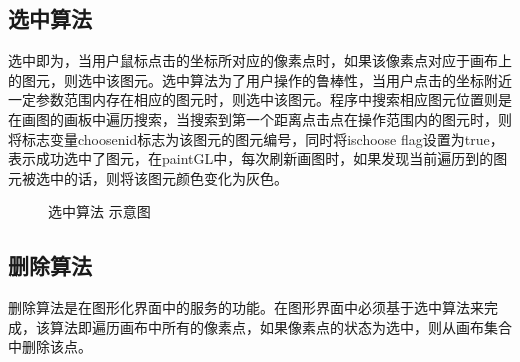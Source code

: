 \documentclass[a4paper,UTF8]{article}
\theoremstyle{definition}
\begin{document}
\subsection{选中算法}
选中即为，当用户鼠标点击的坐标所对应的像素点时，如果该像素点对应于画布上的图元，则选中该图元。选中算法为了用户操作的鲁棒性，当用户点击的坐标附近一定参数范围内存在相应的图元时，则选中该图元。程序中搜索相应图元位置则是在画图的画板中遍历搜索，当搜索到第一个距离点击点在操作范围内的图元时，则将标志变量choosenid标志为该图元的图元编号，同时将ischoose flag设置为true，表示成功选中了图元，在paintGL中，每次刷新画图时，如果发现当前遍历到的图元被选中的话，则将该图元颜色变化为灰色。
\begin{figure}[htbp]
\centering    %
 
 
\caption{选中算法 示意图} %
\label{x1112}  %
\end{figure}
\subsection{删除算法}
删除算法是在图形化界面中的服务的功能。在图形界面中必须基于选中算法来完成，该算法即遍历画布中所有的像素点，如果像素点的状态为选中，则从画布集合中删除该点。
\end{document}
